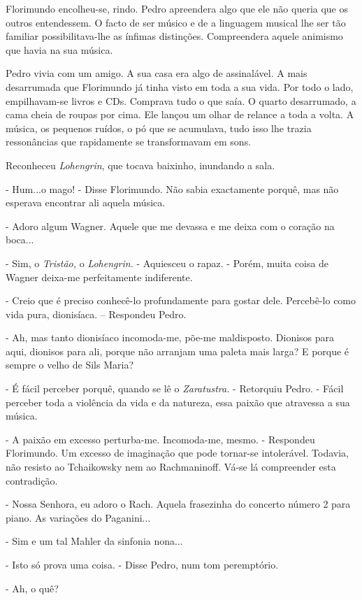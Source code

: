 Florimundo encolheu-se, rindo. Pedro apreendera algo que ele não queria
que os outros entendessem. O facto de ser músico e de a linguagem
musical lhe ser tão familiar possibilitava-lhe as ínfimas distinções.
Compreendera aquele animismo que havia na sua música.

Pedro vivia com um amigo. A sua casa era algo de assinalável. A mais
desarrumada que Florimundo já tinha visto em toda a sua vida. Por todo o
lado, empilhavam-se livros e CDs. Comprava tudo o que saía. O quarto
desarrumado, a cama cheia de roupas por cima. Ele lançou um olhar de
relance a toda a volta. A música, os pequenos ruídos, o pó que se
acumulava, tudo isso lhe trazia ressonâncias que rapidamente se
transformavam em sons.

Reconheceu \emph{Lohengrin}, que tocava baixinho, inundando a sala.

- Hum...o mago! - Disse Florimundo. Não sabia exactamente porquê, mas
não esperava encontrar ali aquela música.

- Adoro algum Wagner. Aquele que me devassa e me deixa com o coração na
boca...

- Sim, o \emph{Tristão, }o \emph{Lohengrin. }- Aquiesceu o rapaz. -
Porém, muita coisa de Wagner deixa-me perfeitamente indiferente.

- Creio que é preciso conhecê-lo profundamente para gostar dele.
Percebê-lo como vida pura, dionisíaca. -- Respondeu Pedro.

- Ah, mas tanto dionisíaco incomoda-me, põe-me maldisposto. Dionisos
para aqui, dionisos para ali, porque não arranjam uma paleta mais larga?
E porque é sempre o velho de Sils Maria?

- É fácil perceber porquê, quando se lê o \emph{Zaratustra. }- Retorquiu
Pedro. - Fácil perceber toda a violência da vida e da natureza, essa
paixão que atravessa a sua música.

- A paixão em excesso perturba-me. Incomoda-me, mesmo. - Respondeu
Florimundo. Um excesso de imaginação que pode tornar-se intolerável.
Todavia, não resisto ao Tchaikowsky nem ao Rachmaninoff. Vá-se lá
compreender esta contradição.

- Nossa Senhora, eu adoro o Rach. Aquela frasezinha do concerto número 2
para piano. As variações do Paganini...

- Sim e um tal Mahler da sinfonia nona...

- Isto só prova uma coisa. - Disse Pedro, num tom peremptório.

- Ah, o quê?

